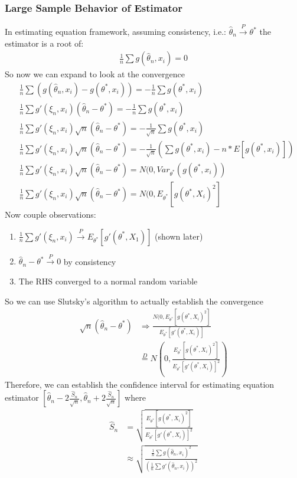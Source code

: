 \subsubsection{Large Sample Behavior of Estimator} 
In estimating equation framework, assuming consistency, i.e.: $\hat{\theta}_n \overset{P}{\to} \theta^*$ the estimator is a root of:
    \begin{align*}
        \frac{1}{n} \sum g(\hat{\theta}_n, x_i) = 0
    \end{align*}
So now we can expand to look at the convergence 
    \begin{align*}
        & \frac{1}{n} \sum \left( g(\hat{\theta}_n, x_i) - g(\theta^*, x_i)\right) = -\frac{1}{n} \sum g(\theta^*, x_i)\\
        & \frac{1}{n}\sum g'(\xi_n, x_i)(\hat{\theta}_n - \theta^*) = -\frac{1}{n} \sum g(\theta^*, x_i) \tag{By mean value theorem} \\
        & \frac{1}{n}\sum g'(\xi_n, x_i)\sqrt{n}(\hat{\theta}_n - \theta^*) = -\frac{1}{\sqrt{n}} \sum g(\theta^*, x_i)\\
        & \frac{1}{n}\sum g'(\xi_n, x_i)\sqrt{n}(\hat{\theta}_n - \theta^*) = -\frac{1}{\sqrt{n}} \left(\sum g(\theta^*, x_i) - n * E[g(\theta^*, x_i)] \right) \tag{Expectation = 0 due to estimating equation setup} \\
        & \frac{1}{n}\sum g'(\xi_n, x_i)\sqrt{n}(\hat{\theta}_n - \theta^*) = N(0, Var_{\theta^*}(g(\theta^*, x_i)) \tag{By CLT}\\
        & \frac{1}{n}\sum g'(\xi_n, x_i)\sqrt{n}(\hat{\theta}_n - \theta^*) = N(0, E_{\theta^*}[g(\theta^*, X_i)^2]
    \end{align*}
Now couple observations: 
    \begin{enumerate}
        \item $\frac{1}{n}\sum g'(\xi_n, x_i) \overset{P}{\to} E_{\theta^*}[g'(\theta^*, X_1)]$ (shown later)
        \item $\hat{\theta}_n - \theta^* \overset{P}{\to} 0$ by consistency
        \item The RHS converged to a normal random variable 
    \end{enumerate}
So we can use Slutsky's algorithm to actually establish the convergence 
    \begin{align*}
        \sqrt{n}(\hat{\theta}_n - \theta^*) 
        & \Rightarrow \frac{N(0, E_{\theta^*}[g(\theta^*, X_i)^2] }{E_{\theta^*}[g'(\theta^*, X_i)]}\\
        & \overset{D}{=} N\left(0, \frac{E_{\theta^*}[g(\theta^*, X_i)^2]}{E_{\theta^*}[g'(\theta^*, X_i)]^2} \right)
    \end{align*}
Therefore, we can establish the confidence interval for estimating equation estimator $[\hat{\theta}_n - 2 \frac{\hat{S}_n}{\sqrt{n}}, \hat{\theta}_n + 2 \frac{\hat{S}_n}{\sqrt{n}}]$ where 
    \begin{align*}
        \hat{S}_n 
        & = \sqrt{\frac{E_{\theta^*}[g(\theta^*, X_i)^2]}{E_{\theta^*}[g'(\theta^*, X_i)]^2}} \\
        & \approx \sqrt{\frac{\frac{1}{n} \sum g(\hat{\theta}_n, x_i)^2}{(\frac{1}{n}\sum g'(\hat{\theta}_n, x_i))^2}}
    \end{align*}

